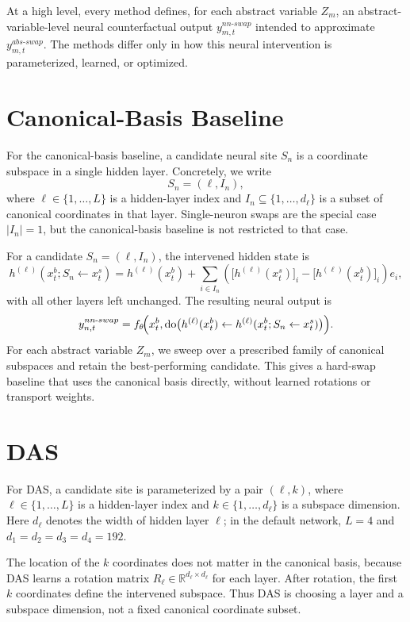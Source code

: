 \documentclass[11pt]{article}
\newcommand{\R}{\mathbb{R}}
\begin{document}
At a high level, every method defines, for each abstract variable $Z_m$, an abstract-variable-level neural counterfactual output $y_{m,t}^{nn\text{-}swap}$ intended to approximate $y_{m,t}^{abs\text{-}swap}$. The methods differ only in how this neural intervention is parameterized, learned, or optimized.

\section{Canonical-Basis Baseline}
For the canonical-basis baseline, a candidate neural site $S_n$ is a coordinate subspace in a single hidden layer. Concretely, we write
\[
S_n = (\ell, I_n),
\]
where $\ell \in \{1,\dots,L\}$ is a hidden-layer index and $I_n \subseteq \{1,\dots,d_\ell\}$ is a subset of canonical coordinates in that layer. Single-neuron swaps are the special case $|I_n|=1$, but the canonical-basis baseline is not restricted to that case.

For a candidate $S_n=(\ell,I_n)$, the intervened hidden state is
\[
h^{(\ell)}(x_t^b; S_n \leftarrow x_t^s)
=
h^{(\ell)}(x_t^b)
+
\sum_{i \in I_n}
\left(
\bigl[h^{(\ell)}(x_t^s)\bigr]_i - \bigl[h^{(\ell)}(x_t^b)\bigr]_i
\right)e_i,
\]
with all other layers left unchanged. The resulting neural output is
\[
y_{n,t}^{nn\text{-}swap}
=
f_\theta\!\Bigl(
x_t^b,
\mathrm{do}\bigl(
h^{(\ell)}(x_t^b)
\leftarrow
h^{(\ell)}(x_t^b; S_n \leftarrow x_t^s)
\bigr)
\Bigr).
\]
For each abstract variable $Z_m$, we sweep over a prescribed family of canonical subspaces and retain the best-performing candidate. This gives a hard-swap baseline that uses the canonical basis directly, without learned rotations or transport weights.

\section{DAS}
For DAS, a candidate site is parameterized by a pair $(\ell,k)$, where $\ell \in \{1,\dots,L\}$ is a hidden-layer index and $k \in \{1,\dots,d_\ell\}$ is a subspace dimension. Here $d_\ell$ denotes the width of hidden layer $\ell$; in the default network, $L=4$ and $d_1=d_2=d_3=d_4=192$.

The location of the $k$ coordinates does not matter in the canonical basis, because DAS learns a rotation matrix $R_\ell \in \R^{d_\ell \times d_\ell}$ for each layer. After rotation, the first $k$ coordinates define the intervened subspace. Thus DAS is choosing a layer and a subspace dimension, not a fixed canonical coordinate subset.
\end{document}
